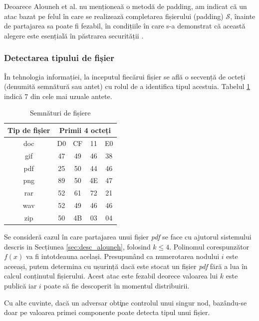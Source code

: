 \documentclass[oneside, 12pt]{book}
\begin{document}
Deoarece Alouneh et al. nu menționeaă o metodă de padding, am indicat că un atac bazat pe felul în care se realizează completarea fișierului (padding) $\mathcal{S}$, înainte de partajarea sa poate fi fezabil, în condițiile în care s-a demonstrat că această alegere este esențială în păstrarea securității \cite{Vaudenay:2002}.

\subsubsection{Detectarea tipului de fișier}
\label{subsec:file_type_detection}

În tehnologia informației, la inceputul fiecărui fișier se află o secvență de octeți (denumită semnătură sau antet) cu rolul de a identifica tipul acestuia. Tabelul {\ref{table:sign}} indică $7$ din cele mai uzuale antete.


\begin{table}[b]
\bigskip
\begin{center}
\caption{Semnături de fișiere}\label{tb:margins}
\label{table:sign}
\begin{tabular}{ccccc}
Tip de fișier &  \multicolumn{4}{c}{Primii 4 octeți}\\ \hline 
doc &  D0 & CF & 11 & E0\\
gif & 47 & 49 & 46 & 38 \\
pdf & 25 & 50 & 44 & 46 \\
png & 89 & 50 & 4E & 47 \\
rar & 52 & 61 & 72 & 21 \\
wav & 52 & 49 & 46 & 46 \\
zip & 50 & 4B & 03 & 04\\  \hline
\end{tabular}
\end{center}
\bigskip
\end{table}

Se consideră cazul în care partajarea unui fișier \textit{pdf} se face cu ajutorul sistemului descris in {S}ecțiunea \ref{sec:desc_alouneh}, folosind $k \leq 4$. Polinomul corespunzător $f(x)$ va fi intotdeauna același. Presupunând ca numerotarea nodului $i$ este aceeași, putem determina cu ușurință dacă este stocat un fișier \textit{pdf} fără a lua în calcul conținutul fișierului.
Acest atac este fezabil deorece valoarea lui $k$ este publică iar $i$ poate să fie descoperit în momentul distribuirii.

Cu alte cuvinte, dacă un adversar obt\c{i}ne controlul unui singur nod, bazându-se doar pe valoarea primei componente poate detecta tipul unui fișier.
\end{document}
